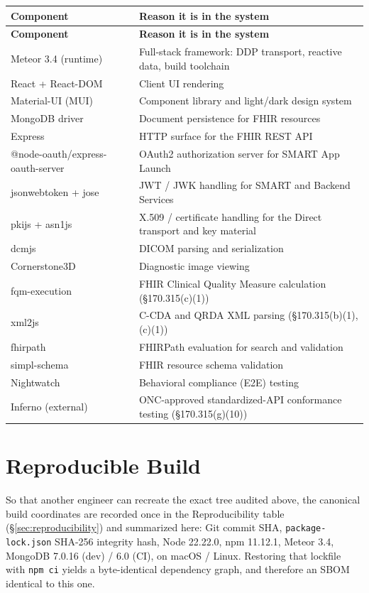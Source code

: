\begin{center}
\begin{longtable}{@{}p{}p{}@{}}
\toprule
\textbf{Component} & \textbf{Reason it is in the system} \\
\midrule
\endfirsthead
\toprule
\textbf{Component} & \textbf{Reason it is in the system} \\
\midrule
\endhead
\bottomrule
\endfoot
Meteor 3.4 (runtime) & Full-stack framework: DDP transport, reactive data, build toolchain \\
React + React-DOM & Client UI rendering \\
Material-UI (MUI) & Component library and light/dark design system \\
MongoDB driver & Document persistence for FHIR resources \\
Express & HTTP surface for the FHIR REST API \\
@node-oauth/express-oauth-server & OAuth2 authorization server for SMART App Launch \\
jsonwebtoken + jose & JWT / JWK handling for SMART and Backend Services \\
pkijs + asn1js & X.509 / certificate handling for the Direct transport and key material \\
dcmjs & DICOM parsing and serialization \\
Cornerstone3D & Diagnostic image viewing \\
fqm-execution & FHIR Clinical Quality Measure calculation (\S170.315(c)(1)) \\
xml2js & C-CDA and QRDA XML parsing (\S170.315(b)(1), (c)(1)) \\
fhirpath & FHIRPath evaluation for search and validation \\
simpl-schema & FHIR resource schema validation \\
Nightwatch & Behavioral compliance (E2E) testing \\
Inferno (external) & ONC-approved standardized-API conformance testing (\S170.315(g)(10)) \\
\end{longtable}
\end{center}

\section{Reproducible Build}

So that another engineer can recreate the exact tree audited above, the
canonical build coordinates are recorded once in the Reproducibility table
(\S\ref{sec:reproducibility}) and summarized here: Git commit SHA,
\texttt{package-lock.json} SHA-256 integrity hash, Node 22.22.0, npm 11.12.1,
Meteor 3.4, MongoDB 7.0.16 (dev) / 6.0 (CI), on macOS / Linux. Restoring that
lockfile with \texttt{npm ci} yields a byte-identical dependency graph, and
therefore an SBOM identical to this one.

